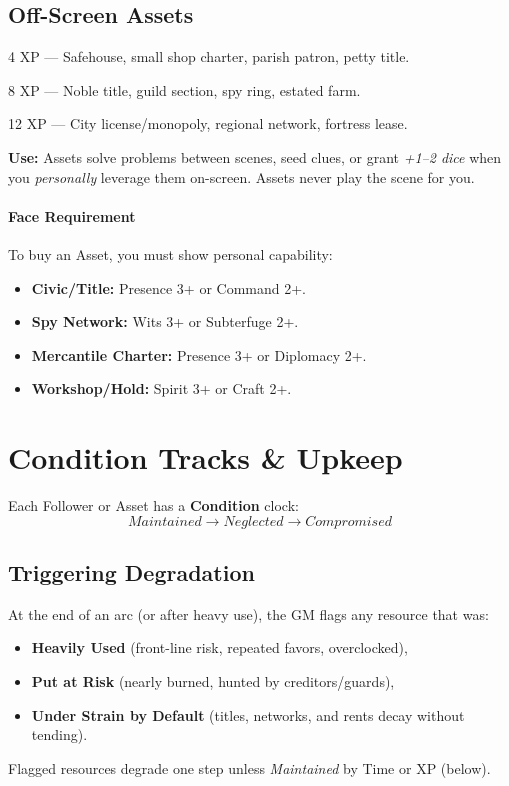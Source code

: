 \documentclass[12pt]{article}
\begin{document}
\subsection{Off-Screen Assets}
\begin{description}[leftmargin=3.2cm]
  \item[Minor] 4 XP — Safehouse, small shop charter, parish patron, petty title.
  \item[Standard] 8 XP — Noble title, guild section, spy ring, estated farm.
  \item[Major] 12 XP — City license/monopoly, regional network, fortress lease.
\end{description}
\textbf{Use:} Assets solve problems between scenes, seed clues, or grant \emph{+1--2 dice} when you \emph{personally} leverage them on-screen. Assets never play the scene for you.

\paragraph{Face Requirement}
To buy an Asset, you must show personal capability:
\begin{itemize}
  \item \textbf{Civic/Title:} Presence 3+ or Command 2+.
  \item \textbf{Spy Network:} Wits 3+ or Subterfuge 2+.
  \item \textbf{Mercantile Charter:} Presence 3+ or Diplomacy 2+.
  \item \textbf{Workshop/Hold:} Spirit 3+ or Craft 2+.
\end{itemize}

\section{Condition Tracks \& Upkeep}
\label{upkeep}
Each Follower or Asset has a \textbf{Condition} clock:
\[
\textit{Maintained} \rightarrow \textit{Neglected} \rightarrow \textit{Compromised}
\]

\subsection{Triggering Degradation}
At the end of an arc (or after heavy use), the GM flags any resource that was:
\begin{itemize}
  \item \textbf{Heavily Used} (front-line risk, repeated favors, overclocked),
  \item \textbf{Put at Risk} (nearly burned, hunted by creditors/guards),
  \item \textbf{Under Strain by Default} (titles, networks, and rents decay without tending).
\end{itemize}
Flagged resources degrade one step unless \emph{Maintained} by Time or XP (below).
\end{document}
